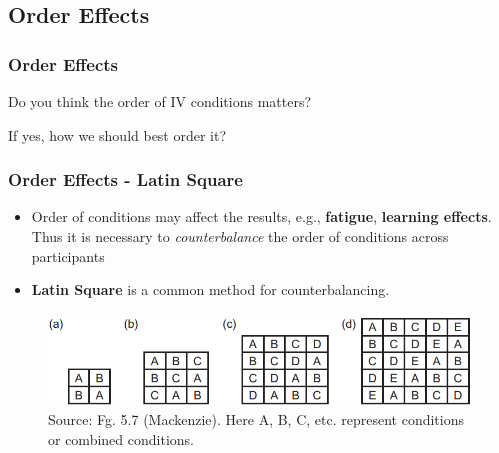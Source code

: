\documentclass{beamer}
\begin{document}
\subsection{Order Effects}

\begin{frame}
\frametitle{Order Effects}
Do you think the order of IV conditions matters?
\vspace{20pt}

If yes, how we should best order it?
\end{frame}

\begin{frame}
\frametitle{Order Effects - Latin Square}
\begin{itemize}
\item Order of conditions may affect the results, e.g., \textbf{fatigue}, \textbf{learning effects}.  Thus it is necessary to \textit{counterbalance} the order of conditions across participants
\item \textbf{Latin Square} is a common method for counterbalancing.  %
\end{itemize}
\begin{figure}
\includegraphics[width=0.8\linewidth]{latin}
\caption{Source: Fg. 5.7 (Mackenzie).  Here A, B, C, etc. represent conditions or combined conditions.}
\end{figure}
\end{frame}
\end{document}
